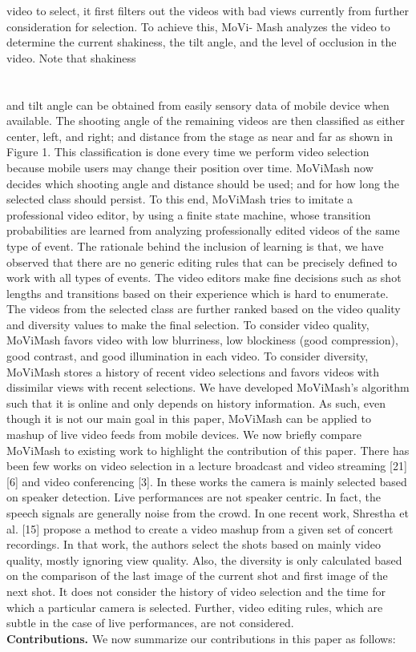 \documentclass{sig-alternate}
\begin{document}
{{{video to select, it first filters out the videos with bad views currently
from further consideration for selection. To achieve this, MoVi-
Mash analyzes the video to determine the current shakiness, the tilt
angle, and the level of occlusion in the video. Note that shakiness
\\\\\\
and tilt angle can be obtained from easily sensory data of mobile
device when available.
The shooting angle of the remaining videos are then classified as
either center, left, and right; and distance from the stage as near and
far as shown in Figure 1. This classification is done every time we
perform video selection because mobile users may change their position
over time. MoViMash now decides which shooting angle and
distance should be used; and for how long the selected class should
persist. To this end, MoViMash tries to imitate a professional video
editor, by using a finite state machine, whose transition probabilities
are learned from analyzing professionally edited videos of the
same type of event. The rationale behind the inclusion of learning
is that, we have observed that there are no generic editing rules
that can be precisely defined to work with all types of events. The
video editors make fine decisions such as shot lengths and transitions
based on their experience which is hard to enumerate.
The videos from the selected class are further ranked based on
the video quality and diversity values to make the final selection.
To consider video quality, MoViMash favors video with low blurriness,
low blockiness (good compression), good contrast, and good
illumination in each video. To consider diversity, MoViMash stores
a history of recent video selections and favors videos with dissimilar
views with recent selections.
We have developed MoViMash’s algorithm such that it is online
and only depends on history information. As such, even though
it is not our main goal in this paper, MoViMash can be applied to
mashup of live video feeds from mobile devices.
We now briefly compare MoViMash to existing work to highlight
the contribution of this paper. There has been few works on
video selection in a lecture broadcast and video streaming [21] [6]
and video conferencing [3]. In these works the camera is mainly
selected based on speaker detection. Live performances are not
speaker centric. In fact, the speech signals are generally noise from
the crowd. In one recent work, Shrestha et al. [15] propose a
method to create a video mashup from a given set of concert recordings.
In that work, the authors select the shots based on mainly
video quality, mostly ignoring view quality. Also, the diversity is
only calculated based on the comparison of the last image of the
current shot and first image of the next shot. It does not consider
the history of video selection and the time for which a particular
camera is selected. Further, video editing rules, which are subtle in
the case of live performances, are not considered.\\
{  }  \textbf{Contributions.} We now summarize our contributions in this paper
as follows:\\

}}}
\end{document}
